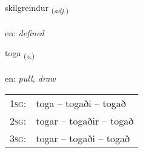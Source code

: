 \documentclass[frontgrid, backgrid]{flacards}\usepackage[]{graphicx}\usepackage[]{xcolor}
\begin{document}
\renewcommand{\flhead}{\vskip5pt \fboxsep=0pt {\small\bfseries\footnotesize Lýsingarorð | Adjective}}
\renewcommand{\fcfoot}{\vskip5pt \fboxsep=0pt \hspace{2pt}{\small\bfseries\footnotesize 3K}}

\renewcommand{\blhead}{\vskip5pt {\small\bfseries\footnotesize Lýsingarorð | Adjective }}
\renewcommand{\bcfoot}{\vskip5pt \hspace{2pt}{\small\bfseries\footnotesize 3K}}


{skilgreindur \small{\textsubscript{(\textit{adj.})}} \\[1ex] %
\textphonetic{[scɪlkreintʏr]} \\
en: \emph{defined} \\  [2ex]
\renewcommand*{\arraystretch}{0.8}
}

\renewcommand{\flhead}{\vskip5pt \fboxsep=0pt {\small\bfseries\footnotesize Sagnorð | Verb}}
\renewcommand{\fcfoot}{\vskip5pt \fboxsep=0pt \hspace{2pt}{\small\bfseries\footnotesize 3K}}

\renewcommand{\blhead}{\vskip5pt {\small\bfseries\footnotesize Sagnorð | Verb }}
\renewcommand{\bcfoot}{\vskip5pt \hspace{2pt}{\small\bfseries\footnotesize 3K}}


{toga \small{\textsubscript{(\textit{v.})}} \\[1ex] %
\textphonetic{[tʰɔːɣa]} \\
en: \emph{pull, draw} \\  [2ex]
\renewcommand*{\arraystretch}{0.8}
\begin{tabular}{p{1cm}l}
\textsc{1sg}: & toga -- togaði -- togað \\ 
\textsc{2sg}: & togar -- togaðir -- togað \\ 
\textsc{3sg}: & togar -- togaði -- togað \\ 
\end{tabular}
}
\end{document}
